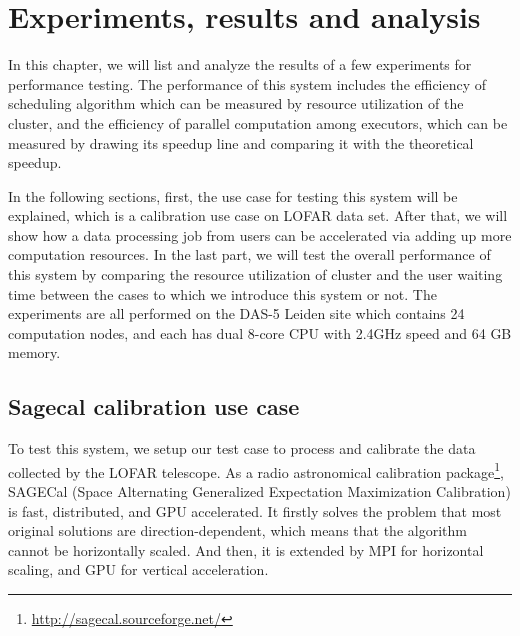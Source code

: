 
\chapter{Experiments, results and analysis } %



\ifpdf
    \graphicspath{{4_analysis&results/figures/PNG/}{4_analysis&results/figures/PDF/}{4_analysis&results/figures/}}
\else
    \graphicspath{{4_analysis&results/figures/EPS/}{4_analysis&results/figures/}}
\fi


% 
In this chapter, we will list and analyze the results of a few experiments for performance testing. 
The performance of this system includes the efficiency of scheduling algorithm which can be measured by resource utilization of the cluster, and the efficiency of parallel computation among executors, which can be measured by drawing its speedup line and comparing it with the theoretical speedup.

In the following sections, first, the use case for testing this system will be explained, which is a calibration use case on LOFAR data set.
After that, we will show how a data processing job from users can be accelerated via adding up more computation resources.
In the last part, we will test the overall performance of this system by comparing the resource utilization of cluster and the user waiting time between the cases to which we introduce this system or not.
The experiments are all performed on the DAS-5 Leiden site which contains 24 computation nodes, and each has dual 8-core CPU with 2.4GHz speed and 64 GB memory.

\section{Sagecal calibration use case}
To test this system, we setup our test case to process and calibrate the data collected by the LOFAR telescope. 
As a radio astronomical calibration package\footnote{\url{http://sagecal.sourceforge.net/}}, SAGECal (Space Alternating Generalized Expectation Maximization Calibration) is fast, distributed, and GPU accelerated.
It firstly solves the problem that most original solutions are direction-dependent, which means that the algorithm cannot be horizontally scaled.
And then, it is extended by MPI for horizontal scaling, and GPU for vertical acceleration.

